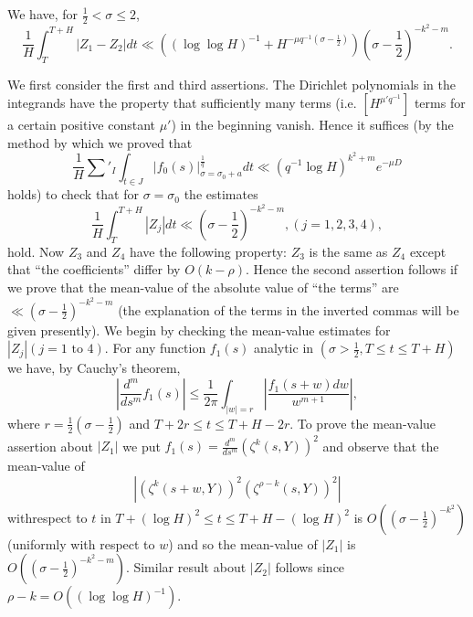 \begin{coro*}
We have, for $\frac{1}{2} < \sigma \leq 2$,
\begin{equation*}
\frac{1}{H} \int^{T + H}_T |Z_1 - Z_2| dt \ll \left((\log \log H)^{-1} + H^{-\mu q^{-1} (\sigma - \frac{1}{2})}  \right) \left( \sigma -\frac{1}{2}\right)^{-k^2 -m }.  \tag{4.2.24}\label{c4:eq4.2.24}
\end{equation*}
\end{coro*}

\medskip
{}
We first consider the first and third assertions. The Dirichlet polynomials in the integrands have the property that sufficiently many terms (i.e. $[H^{\mu' q^{-1}}]$ terms for a certain positive constant $\mu'$) in the beginning vanish. Hence it suffices (by the method by which we proved that
$$
\frac{1}{H} \sum'_I \int_{t \in J} |f_0(s)|^{\frac{1}{q}}_{\sigma = \sigma_0+a } dt \ll (q^{-1} \log H)^{k^2 + m} e^{-\mu D}
$$
holds) to check that for $\sigma = \sigma_0$ the estimates
$$
\frac{1}{H} \int^{T + H}_T |Z_j| dt \ll \left(\sigma -\frac{1}{2}\right)^{-k^2 -m}, (j = 1,2,3,4),
$$
hold. Now $Z_3$ and $Z_4$ have the following property: $Z_3$ is the same as $Z_4$ except that ``the coefficients'' differ by $O(k-\rho)$. Hence the second assertion follows if we prove that the mean-value of the absolute value of ``the terms'' are $\ll (\sigma - \frac{1}{2})^{-k^2 -m}$ (the explanation of the terms in the inverted commas will be given presently). We begin by checking the mean-value estimates for $|Z_j| (j=1 \text{ to }4)$. For any function $f_1(s)$ analytic in $(\sigma > \frac{1}{2}, T \leq t \leq T + H)$ we have, by Cauchy's theorem,
$$
|\frac{d^m}{ds^m} f_1(s)| \leq \frac{1}{2\pi} \int_{|w| =r} |\frac{f_1 (s+w) dw}{w^{m+1}}|,
$$
where $r = \frac{1}{2} (\sigma -\frac{1}{2})$ and $T + 2 r \leq t \leq T + H - 2 r$. To prove the mean-value assertion about $|Z_1|$ we put $f_1(s) = \frac{d^m}{ds^m} (\zeta^k (s,Y))^2$ and observe that the mean-value of 
$$
|(\zeta^k (s+w, Y))^2 (\zeta^{\rho -k} (s, Y))^2|
$$
with\pageoriginale respect to $t$ in $T + (\log H)^2 \leq t \leq T + H - (\log H)^2 $ is $O((\sigma -\frac{1}{2})^{-k^2})$ (uniformly with respect to $w$) and so the mean-value of $|Z_1|$ is $O((\sigma - \frac{1}{2})^{-k^2-m})$. Similar result about $|Z_2|$ follows since $\rho -k = O((\log \log H)^{-1})$. 

